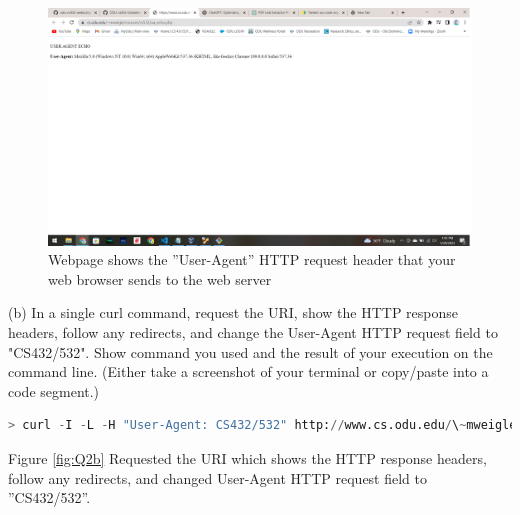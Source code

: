 \documentclass[12pt]{article}
\begin{document}
\begin{figure}[h!]
    \centering
    \includegraphics[trim=0 10 20 20, clip, width=\textwidth] {Q2a.png}
    \caption{Webpage shows the ”User-Agent” HTTP request header that your web browser sends to the web server}
    \label{fig:Q2a}
\end{figure}

(b)  In a single curl command, request the URI, show the HTTP response headers, follow any redirects, and change the User-Agent HTTP request field to "CS432/532". Show command you used and the result of your execution on the command line. (Either take a screenshot of your terminal or copy/paste into a code segment.)

\begin{lstlisting}[language=Python, caption=Python example copied into the LaTeX, label=lst:copy]
> curl -I -L -H "User-Agent: CS432/532" http://www.cs.odu.edu/\~mweigle/courses/cs532/ua_echo.php
\end{lstlisting}

Figure \ref{fig:Q2b} Requested the URI which shows the HTTP response headers, follow any redirects, and changed
User-Agent HTTP request field to ”CS432/532”.
\end{document}
